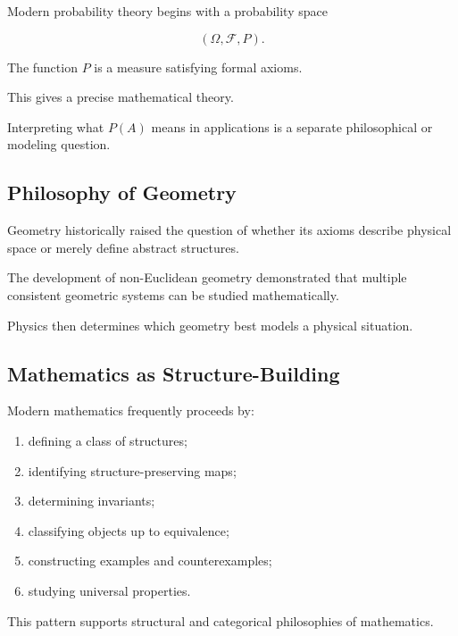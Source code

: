 Modern probability theory begins with a probability space

\[
\boxed{
(\Omega,\mathcal{F},P).
}
\]

The function \(P\) is a measure satisfying formal axioms.

This gives a precise mathematical theory.

Interpreting what \(P(A)\) means in applications is a separate
philosophical or modeling question.

\subsection{Philosophy of Geometry}
\label{subsec:philosophy-geometry}

Geometry historically raised the question of whether its axioms describe
physical space or merely define abstract structures.

The development of non-Euclidean geometry demonstrated that multiple
consistent geometric systems can be studied mathematically.

Physics then determines which geometry best models a physical situation.

\subsection{Mathematics as Structure-Building}
\label{subsec:mathematics-structure-building}

Modern mathematics frequently proceeds by:

\begin{enumerate}
    \item defining a class of structures;
    \item identifying structure-preserving maps;
    \item determining invariants;
    \item classifying objects up to equivalence;
    \item constructing examples and counterexamples;
    \item studying universal properties.
\end{enumerate}

This pattern supports structural and categorical philosophies of
mathematics.

